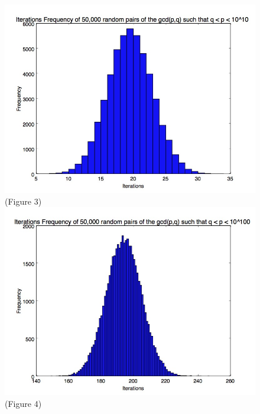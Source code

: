 \documentclass[11pt]{article}
\begin{document}
	\begin{figure}
		\center
		\includegraphics[scale=.4]{10_digit_numbers.jpg}
		\center \tiny(Figure 3)\\
			\includegraphics[scale=.4]{100_digit_numbers_freq.jpg}
		\center \tiny(Figure 4)
		
	\end{figure}
	
	
	
\end{document}
